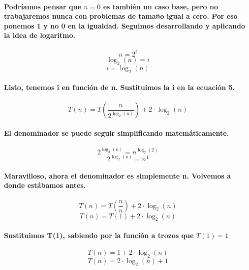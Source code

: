\documentclass{book}
\begin{document}
	\paragraph{Podríamos pensar que $n=0$ es también un caso base, pero no trabajaremos nunca con problemas de tamaño igual a cero. Por eso ponemos 1 y no 0 en la igualdad. Seguimos desarrollando y aplicando la idea de logaritmo.}
	\begin{equation}
	   	n = 2^i \nonumber 
	\end{equation}
	\begin{equation}
		\log_{2}(n) = i \nonumber 
	\end{equation}
	\begin{equation}
	   	i = \log_{2}(n) \nonumber 
	\end{equation}
	\paragraph{Listo, tenemos i en función de n. Sustituimos la i en la ecuación 5.}
	\begin{equation}
		T(n) = T(\frac{n}{2^\mathrm{\log_{2}(n)}}) + 2 \cdot \log_{2}(n)  \nonumber 
	\end{equation}
	\paragraph{El denominador se puede seguir simplificando matemáticamente.}
	\begin{equation}
		2^\mathrm{\log_{2}(n)} = n^\mathrm{\log_{2}(2)} \nonumber 
	\end{equation}
	\begin{equation}
		2^\mathrm{\log_{2}(n)} = n^1 \nonumber 
	\end{equation}
	\paragraph{Maravilloso, ahora el denominador es simplemente n. Volvemos a donde estábamos antes.}
	\begin{equation}
		T(n) = T(\frac{n}{n}) + 2 \cdot \log_{2}(n) \nonumber 
	\end{equation}
	\begin{equation}
		T(n) = T(1) + 2 \cdot \log_{2}(n) \nonumber 
	\end{equation}
	\paragraph{Sustituimos T(1), sabiendo por la función a trozos que $T(1) = 1$}
	\begin{equation}
		T(n) = 1 + 2 \cdot \log_{2}(n) \nonumber 
	\end{equation}
	\begin{equation}
		T(n) = 2 \cdot \log_{2}(n) + 1 
	\end{equation}
\end{document}
